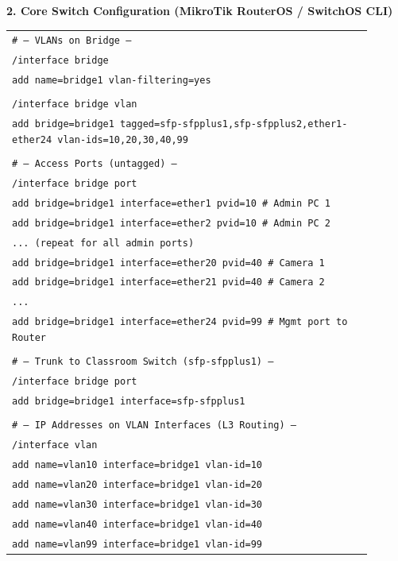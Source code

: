 \documentclass[11pt]{article}
\begin{document}
\begin{exoresolu}
\textbf{2. Core Switch Configuration (MikroTik RouterOS / SwitchOS CLI)}

\begin{center}
\begin{tabular}{|p{0.9\linewidth}|}\hline
\texttt{\# --- VLANs on Bridge ---}\\
\texttt{/interface bridge}\\
\texttt{add name=bridge1 vlan-filtering=yes}\\
\texttt{}\\
\texttt{/interface bridge vlan}\\
\texttt{add bridge=bridge1 tagged=sfp-sfpplus1,sfp-sfpplus2,ether1-ether24 vlan-ids=10,20,30,40,99}\\
\texttt{}\\
\texttt{\# --- Access Ports (untagged) ---}\\
\texttt{/interface bridge port}\\
\texttt{add bridge=bridge1 interface=ether1 pvid=10  \# Admin PC 1}\\
\texttt{add bridge=bridge1 interface=ether2 pvid=10  \# Admin PC 2}\\
\texttt{... (repeat for all admin ports)}\\
\texttt{add bridge=bridge1 interface=ether20 pvid=40 \# Camera 1}\\
\texttt{add bridge=bridge1 interface=ether21 pvid=40 \# Camera 2}\\
\texttt{...}\\
\texttt{add bridge=bridge1 interface=ether24 pvid=99 \# Mgmt port to Router}\\
\texttt{}\\
\texttt{\# --- Trunk to Classroom Switch (sfp-sfpplus1) ---}\\
\texttt{/interface bridge port}\\
\texttt{add bridge=bridge1 interface=sfp-sfpplus1}\\
\texttt{}\\
\texttt{\# --- IP Addresses on VLAN Interfaces (L3 Routing) ---}\\
\texttt{/interface vlan}\\
\texttt{add name=vlan10 interface=bridge1 vlan-id=10}\\
\texttt{add name=vlan20 interface=bridge1 vlan-id=20}\\
\texttt{add name=vlan30 interface=bridge1 vlan-id=30}\\
\texttt{add name=vlan40 interface=bridge1 vlan-id=40}\\
\texttt{add name=vlan99 interface=bridge1 vlan-id=99}\\

\end{tabular}
\end{center}
\end{exoresolu}
\end{document}
